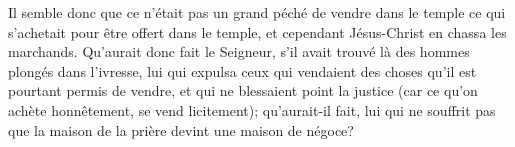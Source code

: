 Il semble donc que ce n’était pas un grand péché
	de vendre dans le temple ce qui s’achetait pour être offert dans le temple,
	et cependant Jésus-Christ en chassa les marchands.
Qu’aurait donc fait le Seigneur,
	s’il avait trouvé là des hommes plongés dans l’ivresse,
	lui qui expulsa ceux qui vendaient des choses
		qu’il est pourtant permis de vendre,
	et qui ne blessaient point la justice
		(car ce qu’on achète honnêtement, se vend licitement);
	qu’aurait-il fait, lui qui ne souffrit pas
		que la maison de la prière devint une maison de négoce?